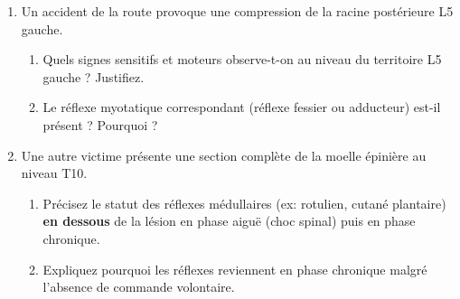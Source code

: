 \documentclass[11pt]{article}
\begin{document}
\begin{exercice}
\begin{enumerate}
    \item Un accident de la route provoque une compression de la racine postérieure L5 gauche.
    \begin{enumerate}
        \item Quels signes sensitifs et moteurs observe-t-on au niveau du territoire L5 gauche ? Justifiez.
        \item Le réflexe myotatique correspondant (réflexe fessier ou adducteur) est-il présent ? Pourquoi ?
    \end{enumerate}
    \item Une autre victime présente une section complète de la moelle épinière au niveau T10.
    \begin{enumerate}
        \item Précisez le statut des réflexes médullaires (ex: rotulien, cutané plantaire) \textbf{en dessous} de la lésion en phase aiguë (choc spinal) puis en phase chronique.
        \item Expliquez pourquoi les réflexes reviennent en phase chronique malgré l'absence de commande volontaire.
    \end{enumerate}
\end{enumerate}
\end{exercice}
\end{document}
